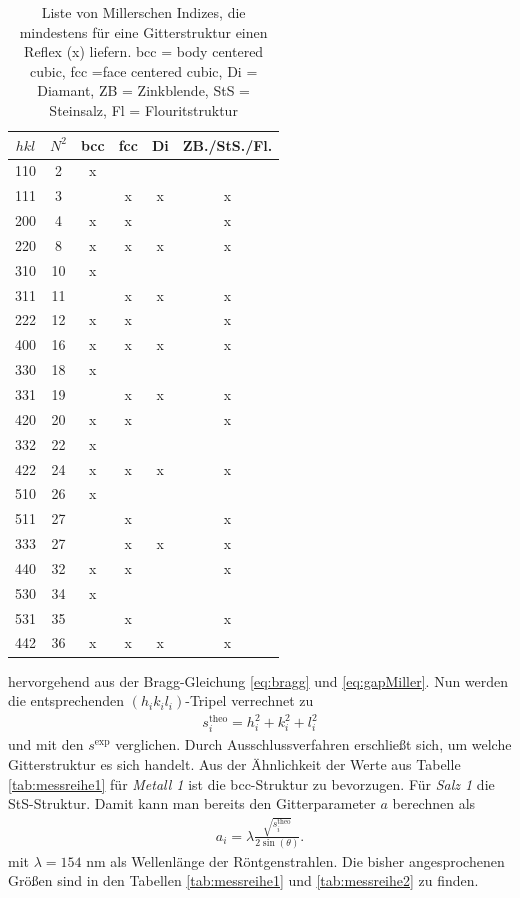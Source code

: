 \begin{table}[t]
\begin{tabular}{cc|cccc}
 $hkl$&$N^2$& bcc & fcc & Di & ZB./StS./Fl.\\
 \hline
 110&2&x&&&\\
 111&3&&x&x&x\\
 200&4&x&x&&x\\
 220&8&x&x&x&x\\
 310&10&x&&&\\
 311&11&&x&x&x\\
 222&12&x&x&&x\\
 400&16&x&x&x&x\\
 330&18&x&&&\\
 331&19&&x&x&x\\
 420&20&x&x&&x\\
 332&22&x&&&\\
 422&24&x&x&x&x\\
 510&26&x&&&\\
 511&27&&x&&x\\
 333&27&&x&x&x\\
 440&32&x&x&&x\\
 530&34&x&&&\\
 531&35&&x&&x\\
 442&36&x&x&x&x\\
\end{tabular}
\caption{Liste von Millerschen Indizes, die mindestens für eine Gitterstruktur einen Reflex (x) liefern. bcc = body centered cubic, fcc =face centered cubic,
 Di = Diamant, ZB = Zinkblende, StS = Steinsalz, Fl = Flouritstruktur}
\label{tab:hklstrukturen}
\end{table}

hervorgehend aus der Bragg-Gleichung \eqref{eq:bragg} und \eqref{eq:gapMiller}. Nun werden die entsprechenden $(h_ik_il_i)$-Tripel verrechnet zu
\begin{align}
 s^\text{theo}_i = h_i^2 + k_i^2 + l_i^2
 \label{eq:structTheo}
\end{align}
und mit den $s^\text{exp}$ verglichen. Durch Ausschlussverfahren erschließt sich, um welche Gitterstruktur es sich handelt. Aus der Ähnlichkeit der Werte
aus Tabelle \ref{tab:messreihe1} für \textit{Metall 1} ist die bcc-Struktur zu bevorzugen. Für \textit{Salz 1} die StS-Struktur.
Damit kann man bereits den Gitterparameter $a$ berechnen als
\begin{align}
 a_i = \lambda\frac{\sqrt{s^\text{theo}_i}}{2\sin(\theta)}.
 \label{eq:gitterparameter}
\end{align}
mit $\lambda=154$ nm als Wellenlänge der Röntgenstrahlen. Die bisher angesprochenen Größen sind in den Tabellen 
\ref{tab:messreihe1} und \ref{tab:messreihe2} zu finden.


